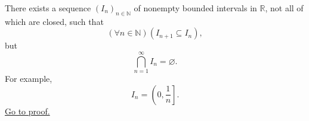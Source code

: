 \begin{proposition}
\label{prop:closedness-is-necessary-in-nested-interval-theorem}
There exists a sequence $(I_n)_{n\in\mathbb{N}}$ of nonempty bounded intervals
in $\mathbb{R}$, not all of which are closed, such that
\[
  (\forall n\in\mathbb{N})(I_{n+1}\subseteq I_n),
\]
but
\[
  \bigcap_{n=1}^{\infty}I_n=\varnothing.
\]
For example,
\[
  I_n=\left(0,\frac{1}{n}\right].
\]
\hyperref[prf:closedness-is-necessary-in-nested-interval-theorem]{Go to proof.}
\end{proposition}
